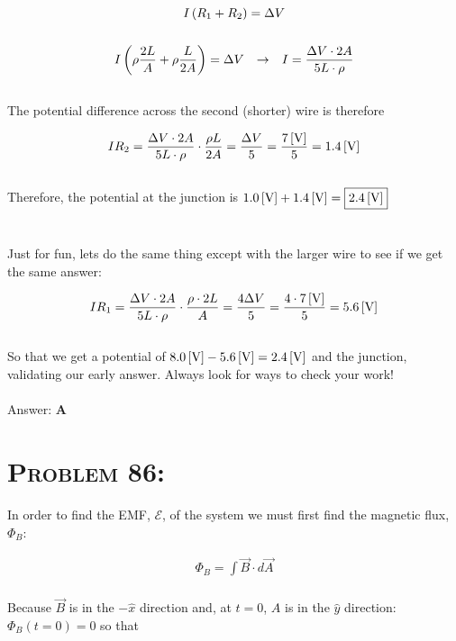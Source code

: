 \documentclass{article}
\begin{document}
\begin{gather}
I \left(  R_{1} + R_{2} \right) = \Delta V\nonumber\\
\nonumber\\
I \left(  \rho \frac{2L}{A} + \rho \frac{L}{2A} \right) = \Delta V \hspace{.1in} \rightarrow \hspace{.1in} I = \frac{\Delta V \cdot 2A} {5 L \cdot \rho}\nonumber
\end{gather}
\\
The potential difference across the second (shorter) wire is therefore

\begin{gather}
I R_{2} = \frac{\Delta V \cdot 2A} {5 L \cdot \rho} \cdot \frac{\rho L} {2A} = \frac{\Delta V}{5} = \frac{ \unit[7]{[V]} }{5} = \unit[1.4]{[V]}\nonumber
\end{gather}
\\
Therefore, the potential at the junction is $\unit[1.0]{[V]} + \unit[1.4]{[V]} = \boxed{\unit[2.4]{[V]}} $\\
\\\\
Just for fun, lets do the same thing except with the larger wire to see if we get the same answer:

\begin{gather}
I R_{1} = \frac{\Delta V \cdot 2A} {5 L \cdot \rho} \cdot \frac{\rho \cdot 2L} {A} = \frac{4 \Delta V}{5} = \frac{4 \cdot \unit[7]{[V]}}{5} = \unit[5.6]{[V]}\nonumber
\end{gather}
\\
So that we get a potential of $\unit[8.0]{[V]} - \unit[5.6]{[V]} = \unit[2.4]{[V]}$ and the junction, validating our early answer. Always look for ways to check your work!
\\\\
Answer: \textbf{\textcolor{ProcessBlue}A}\\


\section{\textsc{Problem 86:}} In order to find the EMF, $\mathcal{E}$, of the system we must first find the magnetic flux, $\Phi_{B}$:

\begin{gather}
\Phi_{B} = \int{\vec{B} \cdot d\vec{A}}
\end{gather}
\\
Because $\vec{B}$ is in the $-\hat{x}$ direction and, at $t = 0$, $A$ is in the $\hat{y}$ direction: $\Phi_{B} (t = 0) = 0$ so that
\end{document}
